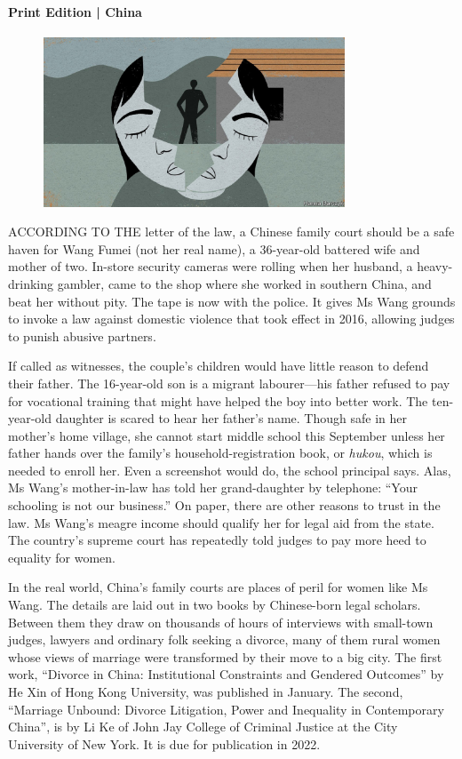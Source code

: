 \documentclass{article}
\begin{document}
\paragraph{Print Edition | China  \quad \color{gray}{Mar 27th 2021 }}
\begin{figure}[h]
\centering
\includegraphics[width=0.8\textwidth]{images/20210327_CND000_0.jpg}
\end{figure}
\lettrine{A}CCORDING TO THE letter of the law, a Chinese family court should be a safe haven for Wang Fumei (not her real name), a 36-year-old battered wife and mother of two. In-store security cameras were rolling when her husband, a heavy-drinking gambler, came to the shop where she worked in southern China, and beat her without pity. The tape is now with the police. It gives Ms Wang grounds to invoke a law against domestic violence that took effect in 2016, allowing judges to punish abusive partners. 

If called as witnesses, the couple's children would have little reason to defend their father. The 16-year-old son is a migrant labourer---his father refused to pay for vocational training that might have helped the boy into better work. The ten-year-old daughter is scared to hear her father's name. Though safe in her mother's home village, she cannot start middle school this September unless her father hands over the family's household-registration book, or \emph{hukou}, which is needed to enroll her. Even a screenshot would do, the school principal says. Alas, Ms Wang's mother-in-law has told her grand-daughter by telephone: ``Your schooling is not our business.'' On paper, there are other reasons to trust in the law. Ms Wang's meagre income should qualify her for legal aid from the state. The country's supreme court has repeatedly told judges to pay more heed to equality for women. 

In the real world, China's family courts are places of peril for women like Ms Wang. The details are laid out in two books by Chinese-born legal scholars. Between them they draw on thousands of hours of interviews with small-town judges, lawyers and ordinary folk seeking a divorce, many of them rural women whose views of marriage were transformed by their move to a big city. The first work, ``Divorce in China: Institutional Constraints and Gendered Outcomes'' by He Xin of Hong Kong University, was published in January. The second, ``Marriage Unbound: Divorce Litigation, Power and Inequality in Contemporary China'', is by Li Ke of John Jay College of Criminal Justice at the City University of New York. It is due for publication in 2022. 
\end{document}

